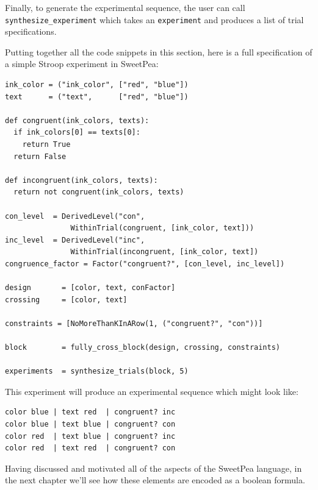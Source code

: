 Finally, to generate the experimental sequence, the user can call \texttt{synthesize\_experiment} which takes an \texttt{experiment} and produces a list of trial specifications.

Putting together all the code snippets in this section, here is a full specification of a simple Stroop experiment in SweetPea:

\begin{verbatim}
ink_color = ("ink_color", ["red", "blue"])
text      = ("text",      ["red", "blue"])

def congruent(ink_colors, texts):
  if ink_colors[0] == texts[0]:
    return True
  return False

def incongruent(ink_colors, texts):
  return not congruent(ink_colors, texts)

con_level  = DerivedLevel("con",
               WithinTrial(congruent, [ink_color, text]))
inc_level  = DerivedLevel("inc",
               WithinTrial(incongruent, [ink_color, text])
congruence_factor = Factor("congruent?", [con_level, inc_level])

design       = [color, text, conFactor]
crossing     = [color, text]

constraints = [NoMoreThanKInARow(1, ("congruent?", "con"))]

block        = fully_cross_block(design, crossing, constraints)

experiments  = synthesize_trials(block, 5)
\end{verbatim}

This experiment will produce an experimental sequence which might look like:

\begin{verbatim}
color blue | text red  | congruent? inc
color blue | text blue | congruent? con
color red  | text blue | congruent? inc
color red  | text red  | congruent? con
\end{verbatim}

Having discussed and motivated all of the aspects of the SweetPea language, in the next chapter we'll see how these elements are encoded as a boolean formula.
